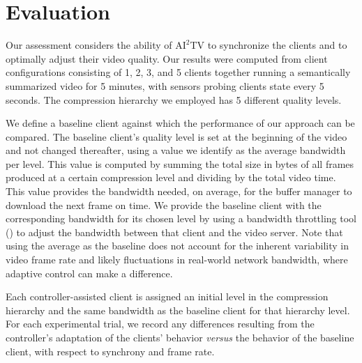 \documentclass{sig-alternate}
\begin{document}
\section{Evaluation} \label{eval}

Our assessment considers the ability of $\mathrm{AI}^2$TV to
synchronize the clients and to optimally adjust their video quality.
Our results were computed from client configurations consisting of 1,
2, 3, and 5 clients together running a semantically summarized video
for 5 minutes, with sensors probing clients state every 5 seconds. The
compression hierarchy we employed has 5 different quality levels.

We define a baseline client against which the performance of our
approach can be compared.  The baseline client's quality level is set
at the beginning of the video and not changed thereafter, using a
value we identify as the average bandwidth per level. This value is
computed by summing the total size in bytes of all frames produced at
a certain compression level and dividing by the total video time.
This value provides the bandwidth needed, on average, for the buffer
manager to download the next frame on time.  We provide the baseline
client with the corresponding bandwidth for its chosen level by using
a bandwidth throttling tool (\cite{SHAPERD}) to adjust the bandwidth
between that client and the video server.  Note that using the average
as the baseline does not account for the inherent variability in video
frame rate and likely fluctuations in real-world network bandwidth,
where adaptive control can make a difference.

Each controller-assisted client is assigned an initial level in the
compression hierarchy and the same bandwidth as the baseline client
for that hierarchy level.  For each experimental trial, we record any
differences resulting from the controller's adaptation of the clients'
behavior {\it versus} the behavior of the baseline client, with
respect to synchrony and frame rate.

 
\end{document}
